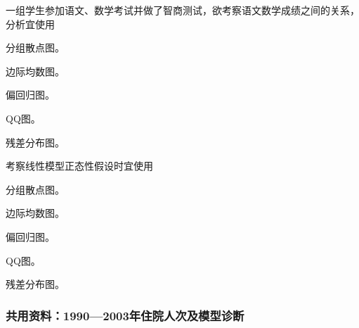 \par\addvspace{6pt}\noindent\begin{minipage}{\linewidth}


一组学生参加语文、数学考试并做了智商测试，欲考察语文数学成绩之间的关系，分析宜使用


\begin{choices}

\item 分组散点图。

\item 边际均数图。

\item 偏回归图。

\item QQ图。

\item 残差分布图。

\end{choices}

\end{minipage}\par\vspace{4pt}

\par\addvspace{6pt}\noindent\begin{minipage}{\linewidth}


考察线性模型正态性假设时宜使用


\begin{choices}

\item 分组散点图。

\item 边际均数图。

\item 偏回归图。

\item QQ图。

\item 残差分布图。

\end{choices}

\end{minipage}\par\vspace{4pt}

\subsubsection*{共用资料：1990—2003年住院人次及模型诊断}

